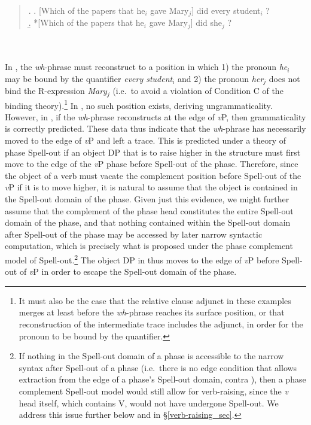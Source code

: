 \singlespacing
\begin{minipage}{5.5in}
\begin{quote}
\ex. \label{legate_ex}
\a. [Which of the papers that he$_{i}$ gave Mary$_{j}$] did every student$_{i}$ ?\\
\b. *[Which of the papers that he$_{i}$ gave Mary$_{j}$] did she$_{j}$ ?

\end{quote}
\end{minipage}\\\\
\onehalfspacing
In \Last, the {\it wh}-phrase must reconstruct to a position in which 1) the pronoun {\it he$_{i}$} may be bound by the quantifier {\it every student$_{i}$} and 2) the pronoun {\it her$_{j}$} does not bind the R-expression {\it Mary$_{j}$} (i.e.\ to avoid a violation of Condition C of the binding theory).\footnote{It must also be the case that the relative clause adjunct in these examples merges at least before the {\it wh}-phrase reaches its surface position, or that reconstruction of the intermediate trace includes the adjunct, in order for the pronoun to be bound by the quantifier.} In \Last[b], no such position exists, deriving ungrammaticality. However, in \Last[a], if the {\it wh}-phrase reconstructs at the edge of {\it v}P, then grammaticality is correctly predicted. These data thus indicate that the {\it wh}-phrase has necessarily moved to the edge of {\it v}P and left a trace. This is predicted under a theory of phase Spell-out if an object DP that is to raise higher in the structure must first move to the edge of the {\it v}P phase before Spell-out of the phase. Therefore, since the object of a verb must vacate the complement position before Spell-out of the {\it v}P if it is to move higher, it is natural to assume that the object is contained in the Spell-out domain of the phase. Given just this evidence, we might further assume that the complement of the phase head constitutes the entire Spell-out domain of the phase, and that nothing contained within the Spell-out domain after Spell-out of the phase may be accessed by later narrow syntactic computation, which is precisely what is proposed under the phase complement model of Spell-out.\footnote{If nothing in the Spell-out domain of a phase is accessible to the narrow syntax after Spell-out of a phase (i.e.\ there is no edge condition that allows extraction from the edge of a phase's Spell-out domain, contra ), then a phase complement Spell-out model would still allow for verb-raising, since the {\it v} head itself, which contains V, would not have undergone Spell-out. We address this issue further below and in \S\ref{verb-raising_sec}.} The object DP in \Last thus moves to the edge of {\it v}P before Spell-out of {\it v}P in order to escape the Spell-out domain of the phase.

